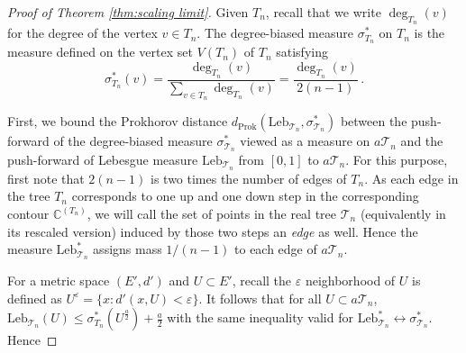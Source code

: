 \documentclass{article}
\newcommand{\1}{\mathbbm{1}}								%
\theoremstyle{definition}
\numberwithin{equation}{section}
\newcommand{\cT}{\mathcal T}
\newcommand{\C}{\mathbb C}
\begin{document}
\begin{proof}[Proof of Theorem \ref{thm:scaling limit}]
Given $T_n$, recall that we write $\deg_{T_n}(v)$ for the degree of the vertex $v \in T_n$. The degree-biased measure $\sigma_{T_n} ^*$ on $T_n$ is the measure defined on the vertex set $V(T_n)$ of $T_n$ satisfying
$$
\sigma_{T_n} ^*(v) = \frac{\deg_{T_n} (v)}{\sum \limits_{v \in T_n } \deg_{T_n} (v)} = \frac{\deg_{T_n} (v)}{2(n-1)} \, .
$$

First, we bound the Prokhorov distance $d_{\mathrm{Prok}}(\mathrm{Leb} _{\cT_n},\sigma_{\cT_n} ^*)$ between the push-forward of the degree-biased measure $\sigma _{\cT_n} ^* $ viewed as a measure on $a\cT_n$ and the push-forward of Lebesgue measure $\mathrm{Leb} _{\cT_n}$ from $[0,1]$ to $a\cT_n$. For this purpose, first note that $2(n-1)$ is two times the number of edges of $T_n$. As each edge in the tree $T_n$ corresponds to one up and one down step in the corresponding contour $\C^{(T_n)}$, we will call the set of points in the real tree $\cT_n$ (equivalently in its rescaled version) induced by those two steps an \emph{edge} as well. Hence the measure $\mathrm{Leb} _{\cT_n}^*$ assigns mass $1/(n-1)$ to each edge of $a\cT_n$.

For a metric space $(E',d')$ and $U \subset E'$, {recall} the $\varepsilon$ neighborhood of $U$ {is} defined {as} $U^{\varepsilon}=\{x:d'(x,U)<\varepsilon\}$. It follows that for all $U\subset a\cT_n$, $\mathrm{Leb} _{\cT_n} (U)\leq \sigma_{T_n} ^*(U^{\frac a 2})+ \frac{a}{2}$ with the same inequality valid for $\mathrm{Leb}_{\cT_n} ^* \leftrightarrow \sigma_{\cT_n} ^*$. Hence 


\end{proof}
\end{document}
